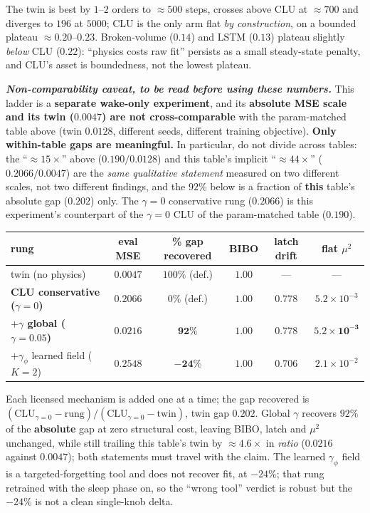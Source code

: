 \documentclass{article}
\begin{document}
The twin is best by $1$--$2$ orders to $\approx500$ steps, crosses above CLU at $\approx700$ and diverges to $196$ at $5000$; CLU is the only arm flat \emph{by construction}, on a bounded plateau $\approx0.20$--$0.23$. Broken-volume ($0.14$) and LSTM ($0.13$) plateau slightly \emph{below} CLU ($0.22$): ``physics costs raw fit'' persists as a small steady-state penalty, and CLU's asset is boundedness, not the lowest plateau.

\emph{\textbf{Non-comparability caveat, to be read before using these numbers.}} This ladder is a \textbf{separate wake-only experiment}, and its \textbf{absolute MSE scale and its twin ($0.0047$) are not cross-comparable} with the param-matched table above (twin $0.0128$, different seeds, different training objective). \textbf{Only within-table gaps are meaningful.} In particular, do not divide across tables: the ``$\approx15\times$'' above ($0.190/0.0128$) and this table's implicit ``$\approx44\times$'' ($0.2066/0.0047$) are the \emph{same qualitative statement} measured on two different scales, not two different findings, and the $92\%$ below is a fraction of \textbf{this} table's absolute gap ($0.202$) only. The $\gamma=0$ conservative rung ($0.2066$) is this experiment's counterpart of the $\gamma=0$ CLU of the param-matched table ($0.190$).

\begin{center}
\begin{tabular}{lccccc}
\toprule
rung & eval MSE & \textbf{\% gap recovered} & BIBO & latch drift & flat $\mu^2$ \\
\midrule
twin (no physics) & $0.0047$ & $100\%$ (def.) & $1.00$ & --- & --- \\
\textbf{CLU conservative ($\gamma=0$)} & $0.2066$ & $0\%$ (def.) & $1.00$ & $0.778$ & $5.2{\times}10^{-3}$ \\
\textbf{$+\gamma$ global ($\gamma=0.05$)} & $0.0216$ & $\mathbf{92\%}$ & $\mathbf{1.00}$ & $\mathbf{0.778}$ & $\mathbf{5.2{\times}10^{-3}}$ \\
$+\gamma_\phi$ learned field ($K=2$) & $0.2548$ & $\mathbf{-24\%}$ & $1.00$ & $0.706$ & $2.1{\times}10^{-2}$ \\
\bottomrule
\end{tabular}
\end{center}

Each licensed mechanism is added one at a time; the gap recovered is $(\mathrm{CLU}_{\gamma=0}-\mathrm{rung})/(\mathrm{CLU}_{\gamma=0}-\mathrm{twin})$, twin gap $0.202$. Global $\gamma$ recovers $92\%$ of the \textbf{absolute} gap at zero structural cost, leaving BIBO, latch and $\mu^2$ unchanged, while still trailing this table's twin by $\approx4.6\times$ in \emph{ratio} ($0.0216$ against $0.0047$); both statements must travel with the claim. The learned $\gamma_\phi$ field is a targeted-forgetting tool and does not recover fit, at $-24\%$; that rung retrained with the sleep phase on, so the ``wrong tool'' verdict is robust but the $-24\%$ is not a clean single-knob delta.
\end{document}
